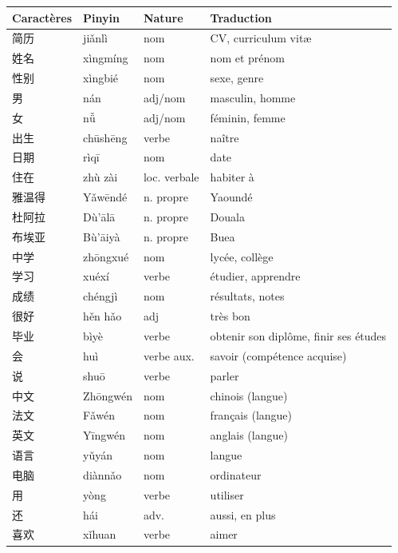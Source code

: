 \documentclass[11pt]{article}
\begin{document}
\begin{definition}
\begin{center}
\begin{tabularx}{\linewidth}{|X|X|X|X|}
\hline
\rowcolor{popblueL} \textbf{Caractères} & \textbf{Pinyin} & \textbf{Nature} & \textbf{Traduction} \\ \hline
简历 & jiǎnlì & nom & CV, curriculum vitæ \\ \hline
姓名 & xìngmíng & nom & nom et prénom \\ \hline
性别 & xìngbié & nom & sexe, genre \\ \hline
男 & nán & adj/nom & masculin, homme \\ \hline
女 & nǚ & adj/nom & féminin, femme \\ \hline
出生 & chūshēng & verbe & naître \\ \hline
日期 & rìqī & nom & date \\ \hline
住在 & zhù zài & loc. verbale & habiter à \\ \hline
雅温得 & Yǎwēndé & n. propre & Yaoundé \\ \hline
杜阿拉 & Dù'ālā & n. propre & Douala \\ \hline
布埃亚 & Bù'āiyà & n. propre & Buea \\ \hline
中学 & zhōngxué & nom & lycée, collège \\ \hline
学习 & xuéxí & verbe & étudier, apprendre \\ \hline
成绩 & chéngjì & nom & résultats, notes \\ \hline
很好 & hěn hǎo & adj & très bon \\ \hline
毕业 & bìyè & verbe & obtenir son diplôme, finir ses études \\ \hline
会 & huì & verbe aux. & savoir (compétence acquise) \\ \hline
说 & shuō & verbe & parler \\ \hline
中文 & Zhōngwén & nom & chinois (langue) \\ \hline
法文 & Fǎwén & nom & français (langue) \\ \hline
英文 & Yīngwén & nom & anglais (langue) \\ \hline
语言 & yǔyán & nom & langue \\ \hline
电脑 & diànnǎo & nom & ordinateur \\ \hline
用 & yòng & verbe & utiliser \\ \hline
还 & hái & adv. & aussi, en plus \\ \hline
喜欢 & xǐhuan & verbe & aimer \\ \hline

\end{tabularx}
\end{center}
\end{definition}
\end{document}
